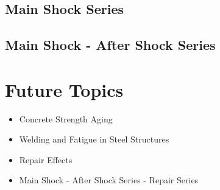 \subsection{Main Shock Series}

\subsection{Main Shock - After Shock Series}

\section{Future Topics}

\begin{itemize}
	\item Concrete Strength Aging
	\item Welding and Fatigue in Steel Structures
	\item Repair Effects
	\item Main Shock - After Shock Series - Repair Series
\end{itemize}
